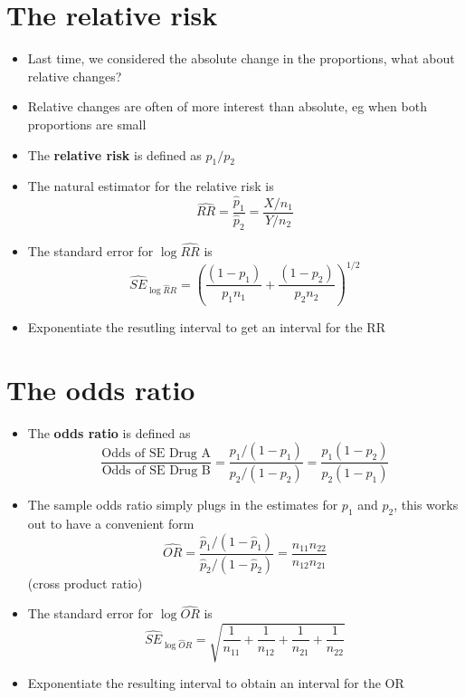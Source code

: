 \documentclass[aspectratio=169]{beamer}
\begin{document}
\section{The relative risk}
\begin{frame}
  \begin{itemize}
  \item Last time, we considered the absolute change in the proportions, what
    about relative changes?
  \item Relative changes are often of more interest than absolute, eg
    when both proportions are small
  \item The {\bf relative risk} is defined as $p_1 / p_2$
  \item The natural estimator for the relative risk is 
    $$\hat{RR} = \frac{\hat p_1}{\hat p_2} = \frac{X / n_1}{Y / n_2}$$
  \item The standard error for $\log \hat{RR}$  is 
    $$
    \hat{SE}_{\log \hat RR} = \left(\frac{(1 - p_1)}{p_1 n_1} + \frac{(1 - p_2)}{p_2 n_2}\right)^{1/2}
    $$
  \item Exponentiate the resutling interval to get an interval for the
    RR
  \end{itemize}
\end{frame}

\section{The odds ratio}
\begin{frame}
  \begin{itemize}
  \item The {\bf odds ratio} is defined as
    $$
    \frac{\mbox{Odds of SE Drug A}}{\mbox{Odds of SE Drug B}} = 
    \frac{p_1 / (1 - p_1)}{p_2 / (1 - p_2)} = 
    \frac{p_1(1-p_2)}{p_2(1 - p_1)}
    $$
  \item The sample odds ratio simply plugs in the estimates for $p_1$ and $p_2$,
    this works out to have a convenient form
    $$
    \hat{OR} = \frac{\hat p_1 / (1 - \hat p_1)}{\hat p_2 / (1 - \hat p_2)}
    = \frac{n_{11}n_{22}}{n_{12}n_{21}}
    $$
    (cross product ratio)
  \item The standard error for $\log \hat{OR}$ is 
    $$
    \hat{SE}_{\log \hat OR} = \sqrt{\frac{1}{n_{11}} + \frac{1}{n_{12}} +\frac{1}{n_{21}} + \frac{1}{n_{22}}}
    $$
  \item Exponentiate the resulting interval to obtain an interval for
    the OR
  \end{itemize}
\end{frame}
\end{document}
